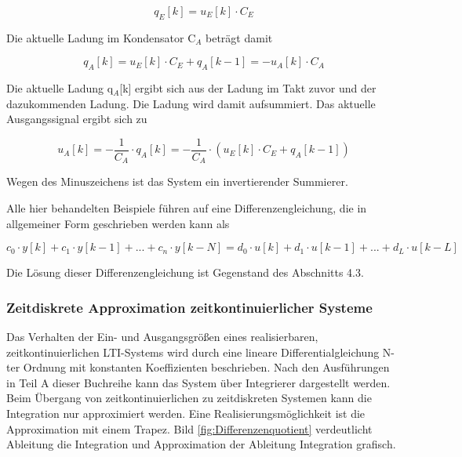 \begin{equation}\label{eq:fourthree}
q_{E} \left[k\right]=u_{E} \left[k\right]\cdot C_{E}  
\end{equation}

\noindent Die aktuelle Ladung im Kondensator C${}_{A}$ betr\"{a}gt damit

\begin{equation}\label{eq:fourfour}
q_{A} \left[k\right]=u_{E} \left[k\right]\cdot C_{E} +q_{A} \left[k-1\right]=-u_{A} \left[k\right]\cdot C_{A}
\end{equation}

\noindent Die aktuelle Ladung q${}_{A}$[k] ergibt sich aus der Ladung im Takt zuvor und der dazukommenden Ladung. Die Ladung wird damit aufsummiert. Das aktuelle Ausgangssignal ergibt sich zu

\begin{equation}\label{eq:fourfive}
u_{A} [k]=-\frac{1}{C_{A} } \cdot q_{A} \left[k\right]=-\frac{1}{C_{A} } \cdot \left(u_{E} \left[k\right]\cdot C_{E} +q_{A} \left[k-1\right]\right)
\end{equation}

\noindent Wegen des Minuszeichens ist das System ein invertierender Summierer.\bigskip

\noindent Alle hier behandelten Beispiele f\"{u}hren auf eine Differenzengleichung, die in allgemeiner Form geschrieben werden kann als 

\begin{equation}\label{eq:foursix}
c_{0} \cdot y\left[k\right]+c_{1} \cdot y\left[k-1\right]+...+c_{n} \cdot y\left[k-N\right]=d_{0} \cdot u\left[k\right]+d_{1} \cdot u\left[k-1\right]+...+d_{L} \cdot u\left[k-L\right]
\end{equation}

\noindent Die L\"{o}sung dieser Differenzengleichung ist Gegenstand des Abschnitts 4.3. 

\subsubsection{Zeitdiskrete Approximation zeitkontinuierlicher Systeme}

\noindent Das Verhalten der Ein- und Ausgangsgr\"{o}{\ss}en eines realisierbaren, zeitkontinuierlichen LTI-Systems wird durch eine lineare Differentialgleichung N-ter Ordnung mit konstanten Koeffizienten beschrieben. Nach den Ausf\"{u}hrungen in Teil A dieser Buchreihe kann das System \"{u}ber Integrierer dargestellt werden. Beim \"{U}bergang von zeitkontinuierlichen zu zeitdiskreten Systemen kann die Integration nur approximiert werden. Eine Realisierungsm\"{o}glichkeit ist die Approximation mit einem Trapez. Bild \ref{fig:Differenzenquotient} verdeutlicht Ableitung die Integration und Approximation der Ableitung Integration grafisch.

